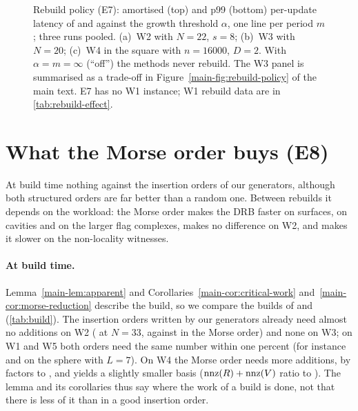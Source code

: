 \begin{figure}[t]
  \centering
  \caption{Rebuild policy (E7): amortised (top) and p99 (bottom) per-update
    latency of  and  against the growth threshold
    $\alpha$, one line per period $m$; three runs pooled. (a)~W2 with $N=22$,
    $s=8$; (b)~W3 with $N=20$; (c)~W4 in the square with $n=16000$, $D=2$. With
    $\alpha=m=\infty$ (``off'') the methods never rebuild. The W3 panel is
    summarised as a trade-off in Figure~\ref{main-fig:rebuild-policy} of the main
    text. E7 has no W1 instance; W1 rebuild data are in
    \cref{tab:rebuild-effect}.}
  \label{fig:rebuild}
\end{figure}

\begin{table}[htbp]
  \centering
  \caption{The full E7 grid: amortised and p99 latency and rebuilds per run of
     and  for every growth threshold $\alpha$ and
    period $m$.}
  \label{tab:e7}
  \scriptsize
  \setlength{\tabcolsep}{3pt}
\end{table}

\section{What the Morse order buys (E8)}\label{sec:s-morse}\label{sec:e8}


At build time nothing against the insertion orders of our generators, although
both structured orders are far better than a random one. Between rebuilds it
depends on the
workload: the Morse order makes the DRB faster on surfaces, on cavities and on
the larger flag complexes, makes no difference on W2, and makes it slower on the
non-locality witnesses.

\paragraph{At build time.} Lemma~\ref{main-lem:apparent} and
Corollaries~\ref{main-cor:critical-work} and~\ref{main-cor:morse-reduction} describe the build, so we compare
the builds of  and  (\cref{tab:build}). The
insertion orders written by our generators already need almost no additions on
W2 (\NumWTwoNThirtyThreeSEightDrbIdBuildAdds{} at $N=33$, against
\NumWTwoNThirtyThreeSEightMmhmNorbBuildAdds{} in the Morse order) and none on
W3; on W1 and W5 both orders need the same number within one percent (for
instance \NumWOneSphereLSevenDrbIdBuildAdds{} and
\NumWOneSphereLSevenMmhmNorbBuildAdds{} on the sphere with $L=7$). On W4 the
Morse order needs more additions, by factors
\NumWFourPlaneNOneThousandDThreeBuildAddsMorseOverId{} to
\NumWFourSpaceNFourThousandDThreeBuildAddsMorseOverId, and yields a slightly
smaller basis ($\operatorname{nnz}(R)+\operatorname{nnz}(V)$ ratio
\NumWFourSpaceNOneThousandDThreeNnzInitMorseOverId{} to
\NumWFourPlaneNOneThousandDTwoNnzInitMorseOverId). The lemma and its corollaries
thus say where the work of a build is done, not that there is less of it than
in a good insertion order.

